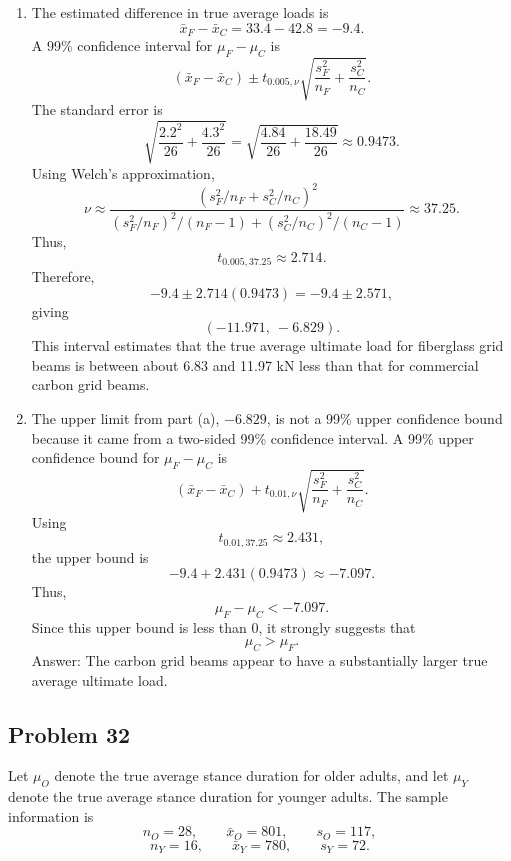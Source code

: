 \documentclass[11pt]{article}
\begin{document}
\begin{enumerate}
\item[(a)] The estimated difference in true average loads is
\[
\bar{x}_F-\bar{x}_C=33.4-42.8=-9.4.
\]
A 99\% confidence interval for $\mu_F-\mu_C$ is
\[
(\bar{x}_F-\bar{x}_C)\pm t_{0.005,\nu}\sqrt{\frac{s_F^2}{n_F}+\frac{s_C^2}{n_C}}.
\]
The standard error is
\[
\sqrt{\frac{2.2^2}{26}+\frac{4.3^2}{26}}
=\sqrt{\frac{4.84}{26}+\frac{18.49}{26}}
\approx 0.9473.
\]
Using Welch's approximation,
\[
\nu\approx
\frac{\left(s_F^2/n_F+s_C^2/n_C\right)^2}{(s_F^2/n_F)^2/(n_F-1)+(s_C^2/n_C)^2/(n_C-1)}
\approx 37.25.
\]
Thus,
\[
t_{0.005,37.25}\approx 2.714.
\]
Therefore,
\[
-9.4\pm 2.714(0.9473)
=-9.4\pm 2.571,
\]
giving
\[
(-11.971,\ -6.829).
\]
This interval estimates that the true average ultimate load for fiberglass grid beams is between about 6.83 and 11.97 kN less than that for commercial carbon grid beams.

\item[(b)] The upper limit from part (a), $-6.829$, is not a 99\% upper confidence bound because it came from a two-sided 99\% confidence interval. A 99\% upper confidence bound for $\mu_F-\mu_C$ is
\[
(\bar{x}_F-\bar{x}_C)+t_{0.01,\nu}\sqrt{\frac{s_F^2}{n_F}+\frac{s_C^2}{n_C}}.
\]
Using
\[
t_{0.01,37.25}\approx 2.431,
\]
the upper bound is
\[
-9.4+2.431(0.9473)\approx -7.097.
\]
Thus,
\[
\mu_F-\mu_C<-7.097.
\]
Since this upper bound is less than 0, it strongly suggests that
\[
\mu_C>\mu_F.
\]
Answer: The carbon grid beams appear to have a substantially larger true average ultimate load.
\end{enumerate}

\subsection*{Problem 32}

Let $\mu_O$ denote the true average stance duration for older adults, and let $\mu_Y$ denote the true average stance duration for younger adults. The sample information is
\[
n_O=28,
\qquad \bar{x}_O=801,
\qquad s_O=117,
\]
\[
n_Y=16,
\qquad \bar{x}_Y=780,
\qquad s_Y=72.
\]
\end{document}
